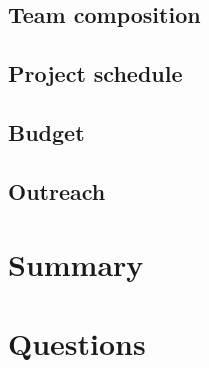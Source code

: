 \documentclass[11pt, aspectratio=169]{beamer}
\begin{document}
\subsection{Team composition}
\subsection{Project schedule}

\subsection{Budget}
    
\subsection{Outreach}


\section{Summary}

\section{Questions}
\end{document}
